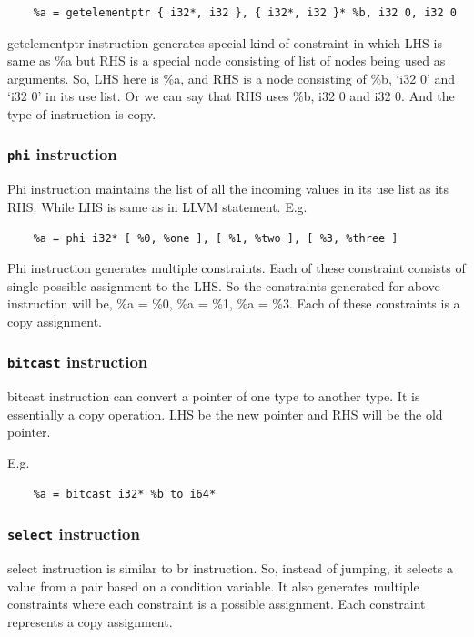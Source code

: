 \documentclass[a4paper,12pt]{report}
\begin{document}
\begin{lstlisting}
    %a = getelementptr { i32*, i32 }, { i32*, i32 }* %b, i32 0, i32 0
\end{lstlisting}

getelementptr instruction generates special kind of constraint in which LHS is 
same as \%a but RHS is a special node consisting of list of nodes being used as 
arguments. So, LHS here is \%a, and RHS is a node consisting of \%b, `i32 0' 
and `i32 0' in its use list. Or we can say that RHS uses \%b, i32 0 and i32 0. And 
the type of instruction is copy.

\subsubsection{\texttt{phi} instruction}
Phi instruction maintains the list of all the incoming values in its use list
as its RHS. While LHS is same as in LLVM statement.
E.g.
\begin{lstlisting}
    %a = phi i32* [ %0, %one ], [ %1, %two ], [ %3, %three ]
\end{lstlisting}

Phi instruction generates multiple constraints. Each of these constraint 
consists of single possible assignment to the LHS. So the constraints generated 
for above instruction will be, \%a = \%0, \%a = \%1, \%a = \%3. Each of these 
constraints is a copy assignment.

\subsubsection{\texttt{bitcast} instruction}
bitcast instruction can convert a pointer of one type to another type. It is
essentially a copy operation. LHS be the new pointer and RHS will be the old 
pointer.

E.g.
\begin{lstlisting}
    %a = bitcast i32* %b to i64*
\end{lstlisting}

\subsubsection{\texttt{select} instruction}
select instruction is similar to br instruction. So, instead of jumping, it
selects a value from a pair based on a condition variable. It also generates 
multiple constraints where each constraint is a possible assignment. Each 
constraint represents a copy assignment.
\end{document}
